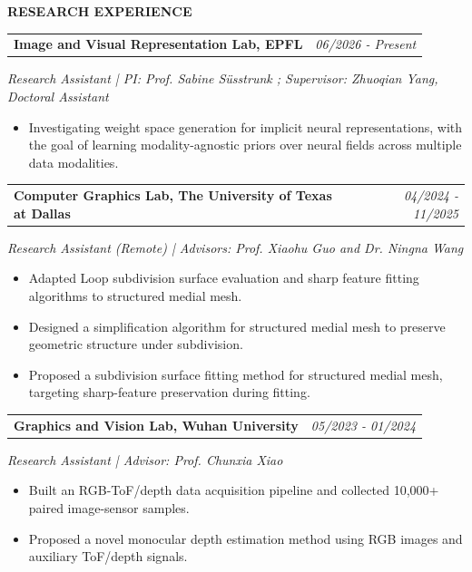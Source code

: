 \documentclass[10pt, letterpaper]{article}
\makeatletter
\newcommand{\sectionlabel}[1]{%
  {\fontsize{9.5pt}{11pt}\selectfont\bfseries\MakeUppercase{#1}}%
}
\newenvironment{cvsection}[1]{%
  \par\vspace{0.86\baselineskip}%
  \Needspace{3\baselineskip}%
  \setcolumnwidth{1.10in,\fill}%
  \begin{paracol}{2}%
  \raggedright\sectionlabel{#1}%
  \switchcolumn
}{%
  \end{paracol}%
}
\newcommand{\externalicon}[1]{%
  \href{#1}{\raisebox{0.12ex}{\normalfont\scriptsize\faExternalLink*}}%
}
\newcommand{\researchentry}[2]{%
  \noindent\begin{tabularx}{\linewidth}{@{}Xr@{}}
    \textbf{#1} & \textit{#2}
  \end{tabularx}%
}
\makeatother
\begin{document}
\begin{cvsection}{Research Experience}
  \researchentry{Image and Visual Representation Lab, {\small EPFL}}{06/2026 - Present}
\textit{Research Assistant | {\small PI: Prof. Sabine Süsstrunk \externalicon{https://people.epfl.ch/sabine.susstrunk?lang=en}; Supervisor: Zhuoqian Yang, 
Doctoral Assistant \externalicon{https://inrainbws.github.io/}}}
\begin{itemize}
  \item Investigating weight space generation for implicit neural representations, with the goal of learning modality-agnostic priors over neural fields across multiple data modalities.
\end{itemize}

\vspace{0.58\baselineskip}
\researchentry{Computer Graphics Lab, {\small The University of Texas at Dallas}}{04/2024 - 11/2025}
\textit{Research Assistant (Remote) | {\small Advisors: Prof. Xiaohu Guo \externalicon{https://personal.utdallas.edu/~xguo/} and Dr. Ningna Wang \externalicon{https://ningnawang.github.io/}}}
\begin{itemize}
  \item Adapted Loop subdivision surface evaluation and sharp feature fitting algorithms to structured medial mesh.
  \item Designed a simplification algorithm for structured medial mesh to preserve geometric structure under subdivision.
  \item Proposed a subdivision surface fitting method for structured medial mesh, targeting sharp-feature preservation during fitting.
\end{itemize}

\vspace{0.58\baselineskip}
\researchentry{Graphics and Vision Lab, {\small Wuhan University}}{05/2023 - 01/2024}
\textit{Research Assistant | {\small Advisor: Prof. Chunxia Xiao \externalicon{http://graphvision.whu.edu.cn/}}}
\begin{itemize}
  \item Built an RGB-ToF/depth data acquisition pipeline and collected 10,000+ paired image-sensor samples.
  \item Proposed a novel monocular depth estimation method using RGB images and auxiliary ToF/depth signals.
\end{itemize}
\end{cvsection}
\end{document}
